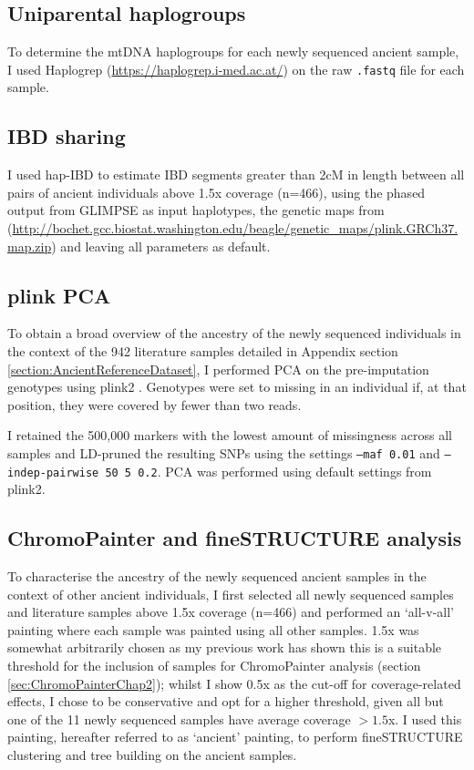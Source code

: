 \subsection{Uniparental haplogroups}

To determine the mtDNA haplogroups for each newly sequenced ancient sample, I used Haplogrep (\url{https://haplogrep.i-med.ac.at/}) \cite{weissensteiner2016haplogrep} on the raw \texttt{.fastq} file for each sample. 

\subsection{IBD sharing}

I used hap-IBD \cite{zhou2020fast} to estimate IBD segments greater than 2cM in length between all pairs of ancient individuals above 1.5x coverage (n=466), using the phased output from GLIMPSE as input haplotypes, the genetic maps  from (\url{http://bochet.gcc.biostat.washington.edu/beagle/genetic_maps/plink.GRCh37.map.zip}) and leaving all parameters as default. 

\subsection{plink PCA}

To obtain a broad overview of the ancestry of the newly sequenced individuals in the context of the 942 literature samples detailed in Appendix section \ref{section:AncientReferenceDataset}, I performed PCA on the pre-imputation genotypes using plink2 \cite{chang2015second}. Genotypes were set to missing in an individual if, at that position, they were covered by fewer than two reads. 

I retained the 500,000 markers with the lowest amount of missingness across all samples and LD-pruned the resulting SNPs using the settings \texttt{--maf 0.01} and \texttt{--indep-pairwise 50 5 0.2}. PCA was performed using default settings from plink2.

\subsection{ChromoPainter and fineSTRUCTURE analysis}

To characterise the ancestry of the newly sequenced ancient samples in the context of other ancient individuals, I first selected all newly sequenced samples and literature samples above 1.5x coverage (n=466) and performed an `all-v-all' painting where each sample was painted using all other samples. 1.5x was somewhat arbitrarily chosen as my previous work has shown this is a suitable threshold for the inclusion of samples for ChromoPainter analysis (section \ref{sec:ChromoPainterChap2}); whilst I show 0.5x as the cut-off for coverage-related effects, I chose to be conservative and opt for a higher threshold, given all but one of the 11 newly sequenced samples have average coverage $>1.5$x. I used this painting, hereafter referred to as `ancient' painting, to perform fineSTRUCTURE clustering and tree building on the ancient samples. 

